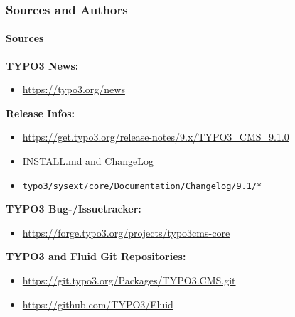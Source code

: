 \begin{frame}[fragile]
	\frametitle{Sources and Authors}
	\framesubtitle{Sources}

	\textbf{TYPO3 News:}
		\begin{itemize}\smaller
			\item \url{https://typo3.org/news}
		\end{itemize}

	\textbf{Release Infos:}
		\begin{itemize}\smaller
			\item \url{https://get.typo3.org/release-notes/9.x/TYPO3_CMS_9.1.0}
			\item \href{https://github.com/TYPO3/TYPO3.CMS/blob/master/INSTALL.md}{INSTALL.md}
				and \href{https://github.com/TYPO3/TYPO3.CMS/tree/master/typo3/sysext/core/Documentation/Changelog}{ChangeLog}
			\item \texttt{typo3/sysext/core/Documentation/Changelog/9.1/*}
		\end{itemize}

	\textbf{TYPO3 Bug-/Issuetracker:}
		\begin{itemize}\smaller
			\item \url{https://forge.typo3.org/projects/typo3cms-core}
		\end{itemize}

	\textbf{TYPO3 and Fluid Git Repositories:}
		\begin{itemize}\smaller
			\item \url{https://git.typo3.org/Packages/TYPO3.CMS.git}
			\item \url{https://github.com/TYPO3/Fluid}
		\end{itemize}

\end{frame}


